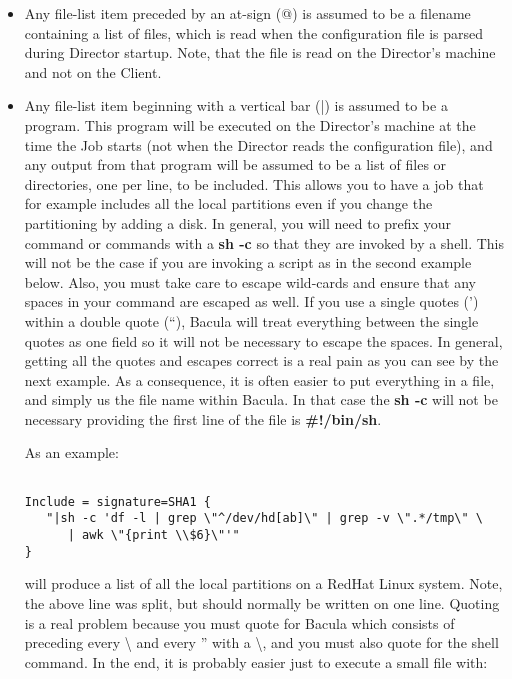 \begin{description}
\begin{itemize}
\item Any file-list item preceded by an at-sign (@) is assumed to be a 
filename containing a list of files, which is read when  the configuration
file is parsed during Director startup.  Note, that the file is read on the
Director's machine  and not on the Client.  
\item Any file-list item beginning with a vertical bar (|) is  assumed to be a
program. This program will be executed  on the Director's machine at the time
the Job starts (not  when the Director reads the configuration file), and any
output  from that program will be assumed to be a list of files or 
directories, one per line, to be included. This allows you to  have a job that
for example includes all the local partitions even  if you change the
partitioning by adding a disk. In general, you will  need to prefix your
command or commands with a {\bf sh -c} so that  they are invoked by a shell.
This will not be the case if you are  invoking a script as in the second
example below. Also, you must  take care to escape wild-cards and ensure that
any spaces in your  command are escaped as well. If you use a single quotes
(') within  a double quote (``), Bacula will treat everything between  the
single quotes as one field so it will not be necessary to  escape the spaces.
In general, getting all the quotes and escapes  correct is a real pain as you
can see by the next example. As a  consequence, it is often easier to put
everything in a file, and simply  us the file name within Bacula. In that case
the {\bf sh -c} will  not be necessary providing the first line of the file is
 {\bf \#!/bin/sh}.  

As an example: 

\footnotesize
\begin{verbatim}
 
Include = signature=SHA1 {
   "|sh -c 'df -l | grep \"^/dev/hd[ab]\" | grep -v \".*/tmp\" \
      | awk \"{print \\$6}\"'"
}
\end{verbatim}
\normalsize

will produce a list of all the local partitions on a RedHat Linux  system.
Note, the above line was split, but should normally  be written on one line. 
Quoting is a real problem because you must quote for Bacula  which consists of
preceding every \textbackslash{} and every '' with a \textbackslash{}, and 
you must also quote for the shell command. In the end, it is probably  easier
just to execute a small file with: 


\end{itemize}
\end{description}
